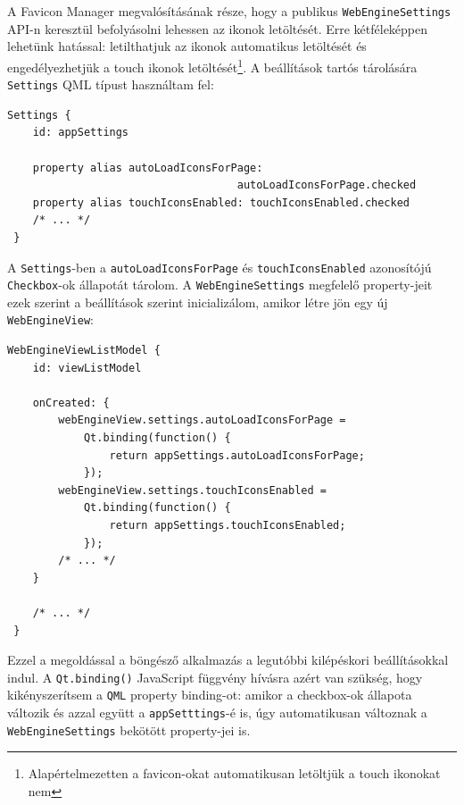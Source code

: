 \documentclass[12pt]{report}
\begin{document}
A Favicon Manager megvalósításának része, hogy a publikus \texttt{WebEngineSettings}
API-n keresztül befolyásolni lehessen az ikonok letöltését. Erre kétféleképpen lehetünk
hatással: letilthatjuk az ikonok automatikus letöltését és engedélyezhetjük a touch
ikonok letöltését\footnote{Alapértelmezetten a favicon-okat automatikusan letöltjük a touch
ikonokat nem}. A beállítások tartós tárolására \texttt{Settings} QML típust használtam fel:
\begin{lstlisting}[title=main.qml]
 Settings {
    id: appSettings

    property alias autoLoadIconsForPage:
                                    autoLoadIconsForPage.checked
    property alias touchIconsEnabled: touchIconsEnabled.checked
    /* ... */
 }
\end{lstlisting}
A \texttt{Settings}-ben a \texttt{autoLoadIconsForPage} és \texttt{touchIconsEnabled}
azonosítójú \texttt{Checkbox}-ok állapotát tárolom. A \texttt{WebEngineSettings} megfelelő
property-jeit ezek szerint a beállítások szerint inicializálom, amikor létre jön egy új
\texttt{WebEngineView}:
\begin{lstlisting}[title=main.qml]
 WebEngineViewListModel {
    id: viewListModel

    onCreated: {
        webEngineView.settings.autoLoadIconsForPage =
            Qt.binding(function() {
                return appSettings.autoLoadIconsForPage;
            });
        webEngineView.settings.touchIconsEnabled =
            Qt.binding(function() {
                return appSettings.touchIconsEnabled;
            });
        /* ... */
    }

    /* ... */
 }
\end{lstlisting}
Ezzel a megoldással a böngésző alkalmazás a legutóbbi kilépéskori beállításokkal indul. A
\texttt{Qt.binding()} JavaScript függvény hívásra azért van szükség, hogy kikényszerítsem
a \texttt{QML} property binding-ot: amikor a checkbox-ok állapota változik és azzal együtt
a \texttt{appSetttings}-é is, úgy automatikusan változnak a \texttt{WebEngineSettings}
bekötött property-jei is.
\end{document}
